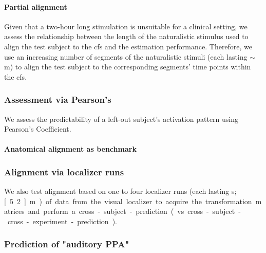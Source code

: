 \paragraph{Partial alignment}
%
Given that a two-hour long stimulation is unsuitable for a clinical setting, we
assess the relationship between the length of the naturalistic stimulus used to
align the test subject to the \ac{cfs} and the estimation performance.
%
Therefore, we use an increasing number of segments of the naturalistic stimuli
(each lasting $\sim$\unit[15]{m}) to align the test subject to the corresponding
segments' time points within the \ac{cfs}.


\subsubsection{Assessment via Pearson's}
%
We assess the predictability of a left-out subject's activation pattern using
Pearson's Coefficient.


\paragraph{Anatomical alignment as benchmark}



\subsubsection{Alignment via localizer runs}


%
We also test alignment based on one to four localizer runs (each lasting
\unit[312]{s}; \unit[5.2]{m}) of data from the visual localizer to acquire the
transformation matrices and perform a cross-subject-prediction (vs.
cross-subject-cross-experiment-prediction).


\subsubsection{Prediction of "auditory PPA"}


